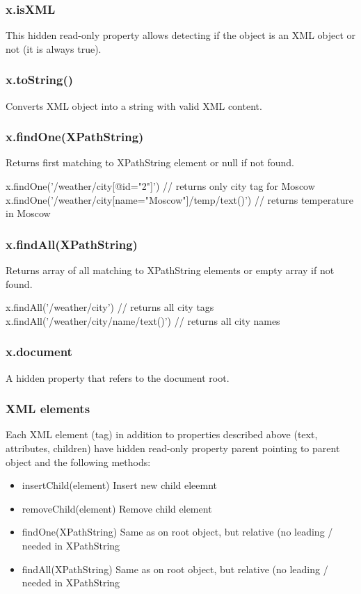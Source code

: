 \subsubsection{x.isXML}
This hidden read-only property allows detecting if the object is an XML object or not (it is always true).

\subsubsection{x.toString()}
Converts XML object into a string with valid XML content.

\subsubsection{x.findOne(XPathString)}
Returns first matching to XPathString element or null if not found.

\begin{listingverbatim}
x.findOne('/weather/city[@id="2"]') // returns only city tag for Moscow
x.findOne('/weather/city[name="Moscow"]/temp/text()') // returns temperature in Moscow
\end{listingverbatim}

\subsubsection{x.findAll(XPathString)}
Returns array of all matching to XPathString elements or empty array if not found.

\begin{listingverbatim}
x.findAll('/weather/city') // returns all city tags
x.findAll('/weather/city/name/text()') // returns all city names
\end{listingverbatim}

\subsubsection{x.document}
A hidden property that refers to the document root.

\subsubsection{XML elements}
Each XML element (tag) in addition to properties described above (text, attributes, 
children) have hidden read-only property parent pointing to parent object and the following methods:
\begin{itemize}
\item insertChild(element) Insert new child eleemnt
\item removeChild(element) Remove child element
\item findOne(XPathString) Same as on root object, but relative (no leading / needed in XPathString
\item findAll(XPathString) Same as on root object, but relative (no leading / needed in XPathString
\end{itemize}

